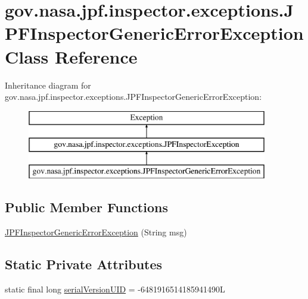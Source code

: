 \hypertarget{classgov_1_1nasa_1_1jpf_1_1inspector_1_1exceptions_1_1_j_p_f_inspector_generic_error_exception}{}\section{gov.\+nasa.\+jpf.\+inspector.\+exceptions.\+J\+P\+F\+Inspector\+Generic\+Error\+Exception Class Reference}
\label{classgov_1_1nasa_1_1jpf_1_1inspector_1_1exceptions_1_1_j_p_f_inspector_generic_error_exception}
Inheritance diagram for gov.\+nasa.\+jpf.\+inspector.\+exceptions.\+J\+P\+F\+Inspector\+Generic\+Error\+Exception\+:\begin{figure}[H]
\begin{center}
\leavevmode
\includegraphics[height=3.000000cm]{classgov_1_1nasa_1_1jpf_1_1inspector_1_1exceptions_1_1_j_p_f_inspector_generic_error_exception}
\end{center}
\end{figure}
\subsection*{Public Member Functions}
\begin{DoxyCompactItemize}
\item 
\hyperlink{classgov_1_1nasa_1_1jpf_1_1inspector_1_1exceptions_1_1_j_p_f_inspector_generic_error_exception_a69f273b4a0dee675d6c673e464b5e7a2}{J\+P\+F\+Inspector\+Generic\+Error\+Exception} (String msg)
\end{DoxyCompactItemize}
\subsection*{Static Private Attributes}
\begin{DoxyCompactItemize}
\item 
static final long \hyperlink{classgov_1_1nasa_1_1jpf_1_1inspector_1_1exceptions_1_1_j_p_f_inspector_generic_error_exception_a4e9f676355c139d6d71fca9bd5770b44}{serial\+Version\+U\+ID} = -\/6481916514185941490L
\end{DoxyCompactItemize}


